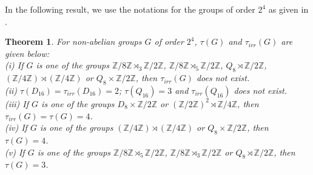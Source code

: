 \documentclass[a4paper,11pt]{amsart}
\numberwithin{equation}{section}
\numberwithin{equation}{subsection}
\newtheorem{theorem}{Theorem}[section]
\begin{document}
In the following result, we use the notations for the groups of order $2^4$ as given in \cite{ConradGroups16}.
\begin{theorem}
For non-abelian groups $G$ of order $2^4$, $\tau(G)$ and $\tau_{irr}(G)$ are given below: \\
(i) If $G$ is one of the groups $ \mathbb{Z}/8\mathbb{Z} \rtimes_{3} \mathbb{Z}/2\mathbb{Z}$, $\mathbb{Z}/8\mathbb{Z} \rtimes_{5} \mathbb{Z}/2\mathbb{Z}$, $Q_{8} \rtimes \mathbb{Z}/2\mathbb{Z}$, $(\mathbb{Z}/4\mathbb{Z}) \rtimes (\mathbb{Z}/4\mathbb{Z})$ or $Q_{8} \times \mathbb{Z}/2\mathbb{Z}$, then $\tau_{irr}(G)$ does not exist. \\
(ii) $\tau(D_{16})= \tau_{irr}(D_{16})=2$;  $\tau(Q_{16}) =3$ and $\tau_{irr}(Q_{16})$ does not exist. \\
(iii) If $G$ is one of the groups $D_{8} \times \mathbb{Z}/2\mathbb{Z}$ or $(\mathbb{Z}/2\mathbb{Z})^{2} \rtimes \mathbb{Z}/4\mathbb{Z}$, then $\tau_{irr}(G) = \tau(G) = 4$. \\
(iv) If $G$ is one of the groups $(\mathbb{Z}/4\mathbb{Z}) \rtimes (\mathbb{Z}/4\mathbb{Z})$ or $Q_{8} \times \mathbb{Z}/2\mathbb{Z}$, then $\tau(G)= 4$. \\
(v) If $G$ is one of the groups $\mathbb{Z}/8\mathbb{Z} \rtimes_{5} \mathbb{Z}/2\mathbb{Z}$, $\mathbb{Z}/8\mathbb{Z} \rtimes_{3} \mathbb{Z}/2\mathbb{Z}$ or $Q_{8} \rtimes \mathbb{Z}/2\mathbb{Z}$, then $\tau(G)=3$. 
\end{theorem}
\end{document}
